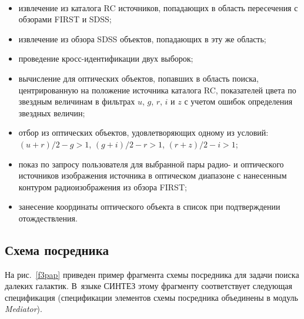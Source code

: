 \begin{multicols}{2}
\begin{figure*} %
\vspace*{1pt}
\begin{center}
\mbox{%
\epsfxsize=118mm
}
\end{center}
\vspace*{-6pt}
\vspace*{-3pt}
\end{figure*}

\noindent
     \begin{itemize}
\item извлечение из каталога RC источников, по\-па\-да\-ющих в область пересечения с
обзорами FIRST и SDSS;
\item извлечение из обзора SDSS объектов, по\-па\-да\-ющих в эту же область;
\item проведение кросс-идентификации двух выборок;
\item вычисление для оптических объектов, попавших в область поиска, центрированную на
положение источника каталога RC, показателей цвета по звездным
величинам в фильтрах $u$, $g$, $r$, $i$ и $z$ с учетом ошибок определения звездных
величин;
\item отбор из оптических объектов, %
удов\-ле\-тво\-ря\-ющих 
одному из условий:
$(u+r)/2 - g > 1$, $(g+i)/2 - r > 1$, $(r+z)/2 - i > 1$;
\item показ по запросу пользователя для выбранной пары радио- и оптического источников
изоб\-ра\-же\-ния источника в оптическом диапазоне с нанесенным контуром
радиоизображения из обзора FIRST;\\[-15pt]
\item занесение координаты оптического объекта в
список при подтверждении отождествления.\\[-15pt]
\end{itemize}


\subsection{Схема посредника}

     На рис.~\ref{f3pap} приведен пример фрагмента схемы посредника для задачи
поиска далеких галактик. В~языке СИНТЕЗ этому фрагменту соответствует следующая
спецификация (спецификации элементов схемы посредника объединены в модуль
\textit{Mediator}).
{

}


\end{multicols}
